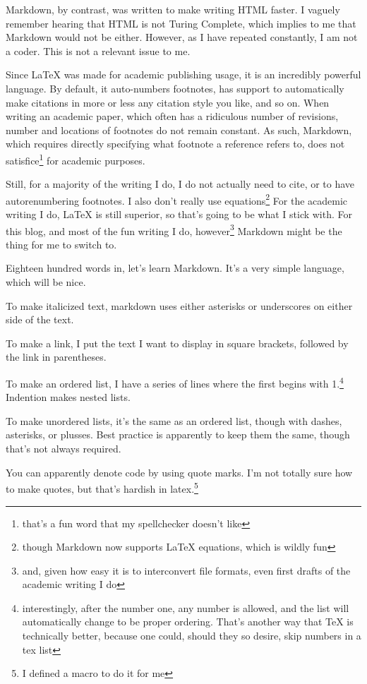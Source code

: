 \documentclass[12pt]{article}[titlepage]
\newcommand{\1}{\={a}}
\newcommand{\2}{\={e}}
\newcommand{\3}{\={\i}}
\newcommand{\4}{\=o}
\newcommand{\5}{\=u}
\newcommand{\6}{\={A}}
\renewcommand{\,}{\textsuperscript{,}}
\begin{document}
Markdown, by contrast, was written to make writing HTML faster.
I vaguely remember hearing that HTML is not Turing Complete, which implies to me that Markdown would not be either.
However, as I have repeated constantly, I am not a coder.
This is not a relevant issue to me.

Since LaTeX was made for academic publishing usage, it is an incredibly powerful language.
By default, it auto-numbers footnotes, has support to automatically make citations in more or less any citation style you like, and so on.
When writing an academic paper, which often has a ridiculous number of revisions, number and locations of footnotes do not remain constant.
As such, Markdown, which requires directly specifying what footnote a reference refers to, does not satisfice\footnote{that's a fun word that my spellchecker doesn't like} for academic purposes.

Still, for a majority of the writing I do, I do not actually need to cite, or to have autorenumbering footnotes.
I also don't really use equations\footnote{though Markdown now supports LaTeX equations, which is wildly fun}
For the academic writing I do, LaTeX is still superior, so that's going to be what I stick with.
For this blog, and most of the fun writing I do, however\footnote{and, given how easy it is to interconvert file formats, even first drafts of the academic writing I do} Markdown might be the thing for me to switch to.

Eighteen hundred words in, let's learn Markdown.
It's a very simple language, which will be nice.

To make italicized text, markdown uses either asterisks or underscores on either side of the text. 

To make a link, I put the text I want to display in square brackets, followed by the link in parentheses.

To make an ordered list, I have a series of lines where the first begins with 1.\footnote{interestingly, after the number one, any number is allowed, and the list will automatically change to be proper ordering. That's another way that TeX is technically better, because one could, should they so desire, skip numbers in a tex list}
Indention makes nested lists.

To make unordered lists, it's the same as an ordered list, though with dashes, asterisks, or plusses.
Best practice is apparently to keep them the same, though that's not always required.

You can apparently denote code by using quote marks.
I'm not totally sure how to make quotes, but that's hardish in latex.\footnote{I defined a macro to do it for me}
\end{document}

